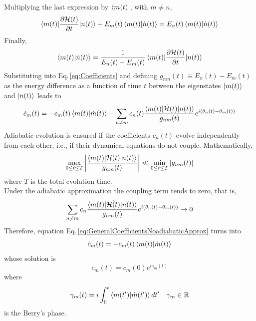 Multiplying the last expression by $\bra{m(t)}$, with $m\neq n$,
\begin{equation}
    \braket{m(t)|\frac{\partial\mathcal{H}(t)}{\partial t}|n(t)} + E_{m}(t)\braket{m(t)|\dot{n}(t)} = E_{n}(t)\braket{m(t)|\dot{n}(t)}
\end{equation}
Finally,
\begin{equation}
    \braket{m(t)|\dot{n}(t)} = \frac{1}{E_{n}(t)-E_{m}(t)}\braket{m(t)|\frac{\partial \mathcal{H}(t)}{\partial t}|n(t)}
\end{equation}
Substituting into Eq.\,\eqref{eq:Coefficients} and defining $g_{nm}(t)\equiv E_{n}(t) - E_{m}(t)$ as the energy difference as a function of time $t$ between the eigenstates $\ket{m(t)}$ and $\ket{n(t)}$ leads to
\begin{equation}
\label{eq:GeneralCoefficientsNoadiabaticApprox}
    \dot{c}_{m}(t) = -c_{m}(t) \braket{m(t)|\dot{m}(t)} - \sum_{n\neq m} c_{n}(t)\frac{\braket{m(t)|\dot{\mathcal{H}}(t)|n(t)}}{g_{nm}(t)}e^{i\left(\theta_{n}(t) - \theta_{m}(t)\right)}
\end{equation}
Adiabatic evolution is ensured if the coefficients $c_{n}(t)$ evolve independently from each other, i.e., if their dynamical equations do not couple. Mathematically,
\begin{equation}
    \max_{0 \leq t \leq T} \abs{\frac{\braket{m(t)|\dot{\mathcal{H}}(t)|n(t)}}{g_{nm}(t)}} \ll \min_{0\leq t \leq T} \abs{g_{nm}(t)}
\end{equation}
where $T$ is the total evolution time.\\ 
Under the adiabatic approximation the coupling term tends to zero, that is,
\begin{equation}
    \sum_{n\neq m} c_{n}\frac{\braket{m(t)|\dot{\mathcal{H}(t)}|n(t)}}{g_{nm}(t)}e^{i\left(\theta_{n}(t) - \theta_{m}(t)\right)} \to 0
\end{equation}
Therefore, equation Eq.\,\eqref{eq:GeneralCoefficientsNoadiabaticApprox} turns into
\begin{equation}
    \dot{c}_{m}(t) = -c_{m}(t)\braket{m(t)|\dot{m}(t)}
\end{equation}
whose solution is
\begin{equation}
    c_{m}(t) = c_{m}(0)e^{i\gamma_{m}(t)}
\end{equation}
where
\begin{equation}
    \gamma_{m}(t) = i\int_{0}^{t}\braket{m(t^{\prime})|\dot{m}(t^{\prime})}dt^{\prime} \quad \gamma_{m}\in \mathbb{R}
\end{equation}
is the Berry's phase.
